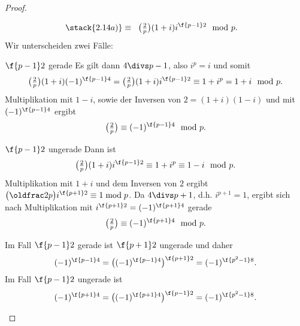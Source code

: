 \begin{st}
\begin{proof}
\begin{enumerate}[a)]
\begin{align*}
					&\stack{2.14 a)}\equiv \;\; \legsym 2p (1+i)i^{\f{p-1}2} \mod p.
				\end{align*}
				Wir unterscheiden zwei Fälle:
				\begin{segnb}{$\f{p-1}2$ gerade}
					Es gilt dann $4 \divs p - 1$, also $i^p = i$ und somit
					\[
						\legsym 2p (1+i) (-1)^{\f{p-1}4}
						= \legsym 2p (1+i) i^{\f{p-1}2}
						\equiv 1 + i^p
						= 1 + i \mod p.
					\]
					Multiplikation mit $1 - i$, sowie der Inversen von $2 = (1 + i)(1 - i)$ und mit $(-1)^{\f{p-1}4}$ ergibt
					\[
						\legsym 2p
						\equiv (-1)^{\f{p-1}4} \mod p.
					\]
				\end{segnb}
				\begin{segnb}{$\f{p-1}2$ ungerade}
					Dann ist
					\[
						\legsym 2p (1+i) i^{\f{p-1}2}
						\equiv 1 + i^p
						\equiv 1 - i \mod p.
					\]
					Multiplikation mit $1 + i$ und dem Inversen von $2$ ergibt $\legsym 2p i^{\f{p+1}2} \equiv 1 \bmod p$.
					Da $4 \divs p + 1$, d.h. $i^{p+1} = 1$, ergibt sich nach Multiplikation mit $i^{\f{p+1}2} = (-1)^{\f{p+1}4}$ gerade
					\[
						\legsym 2p \equiv (-1)^{\f{p+1}4} \mod p.
					\]
				\end{segnb}
				Im Fall $\f{p-1}2$ gerade ist $\f{p+1}2$ ungerade und daher
				\[
					(-1)^{\f{p-1}4}
					= \big((-1)^{\f{p-1}4}\big)^{\f{p+1}2}
					= (-1)^{\f{p^2-1}8}.
				\]
				Im Fall $\f{p-1}2$ ungerade ist
				\[
					(-1)^{\f{p+1}4}
					= \big((-1)^{\f{p+1}4}\big)^{\f{p-1}2}
					= (-1)^{\f{p^2-1}8}.
				\]
		\end{enumerate}
	\end{proof}
\end{st}


